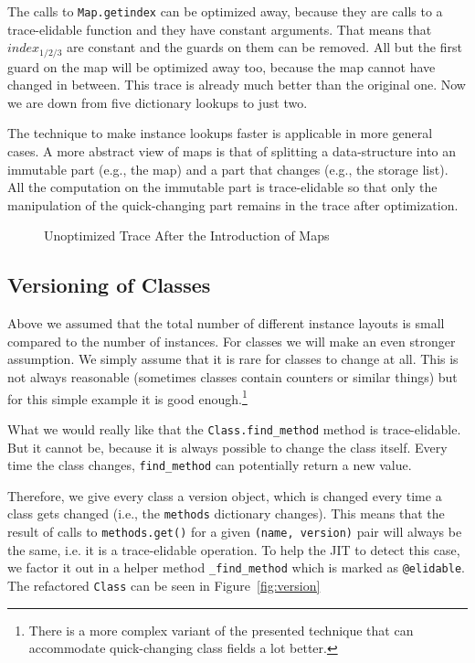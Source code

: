 \documentclass{sigplanconf}
\newcommand\eg{e.g.,\xspace}
\begin{document}
The calls to \texttt{Map.getindex} can be optimized away, because they are calls to
a trace-elidable function and they have constant arguments. That means that $index_{1/2/3}$
are constant and the guards on them can be removed. All but the first guard on
the map will be optimized away too, because the map cannot have changed in
between. This trace is already much better than
the original one. Now we are down from five dictionary lookups to just two.

The technique to make instance lookups faster is applicable in more general
cases. A more abstract view of maps is that of splitting a data-structure into
an immutable part (\eg the map) and a part that changes (\eg the storage list).
All the computation on the immutable part is trace-elidable so that only the
manipulation of the quick-changing part remains in the trace after
optimization.

\begin{figure}

\caption{Unoptimized Trace After the Introduction of Maps}
\label{fig:trace2}
\end{figure}





\subsection{Versioning of Classes}

Above we assumed that the total number of
different instance layouts is small compared to the number of instances. For classes we
will make an even stronger assumption. We simply assume that it is rare for
classes to change at all. This is not always reasonable (sometimes classes contain
counters or similar things) but for this simple example it is good
enough.\footnote{There is a more complex variant of the presented technique that can
accommodate quick-changing class fields a lot better.}

What we would really like that the \texttt{Class.find\_method} method is trace-elidable.
But it cannot be, because it is always possible to change the class itself.
Every time the class changes, \texttt{find\_method} can potentially return a
new value.

Therefore, we give every class a version object, which is changed every time a
class gets changed (i.e., the \texttt{methods} dictionary changes).
This means that the result of calls to \texttt{methods.get()} for a given \texttt{(name,
version)} pair will always be the same, i.e. it is a trace-elidable operation.  To help
the JIT to detect this case, we factor it out in a helper method \texttt{\_find\_method} which is
marked as \texttt{@elidable}. The refactored \texttt{Class} can
be seen in Figure~\ref{fig:version}
\end{document}
